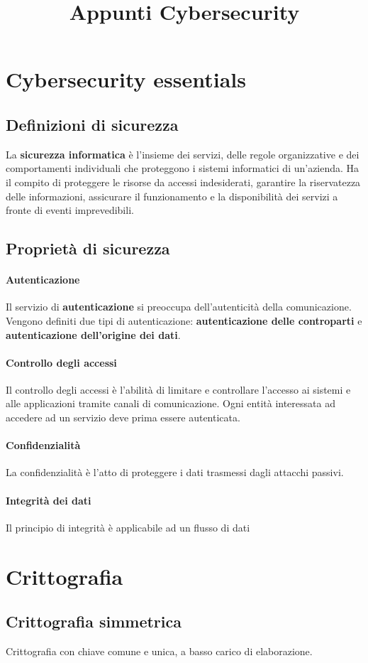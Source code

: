 \documentclass[11pt]{article}
\title{Appunti Cybersecurity}
\begin{document}
\section{Cybersecurity essentials}
\subsection{Definizioni di sicurezza}
La \textbf{sicurezza informatica} è l'insieme dei servizi, delle regole organizzative e dei comportamenti individuali che proteggono 
i sistemi informatici di un'azienda. Ha il compito di proteggere le risorse da accessi indesiderati, garantire la riservatezza 
delle informazioni, assicurare il funzionamento e la disponibilità dei servizi a fronte di eventi imprevedibili.
\subsection{Proprietà di sicurezza}
\paragraph*{Autenticazione}
Il servizio di \textbf{autenticazione} si preoccupa dell'autenticità della comunicazione. Vengono definiti due tipi di 
autenticazione: \textbf{autenticazione delle controparti} e \textbf{autenticazione dell'origine dei dati}.
\paragraph*{Controllo degli accessi}
Il controllo degli accessi è l'abilità di limitare e controllare l'accesso ai sistemi e alle applicazioni tramite canali
di comunicazione. Ogni entità interessata ad accedere ad un servizio deve prima essere autenticata.
\paragraph*{Confidenzialità}
La confidenzialità è l'atto di proteggere i dati trasmessi dagli attacchi passivi. 
\paragraph*{Integrità dei dati}
Il principio di integrità è applicabile ad un flusso di dati

\section{Crittografia}
\subsection{Crittografia simmetrica}
Crittografia con chiave comune e unica, a basso carico di elaborazione.
\end{document}

